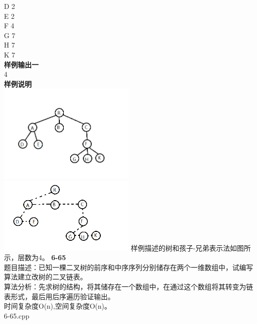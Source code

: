 \documentclass[UTF8,a4paper]{article}
\begin{document}
D 2\\
E 2\\
F 4\\
G 7\\
H 7\\
K 7\\
\textbf{样例输出一}\\
4\\
\textbf{样例说明}\\
\includegraphics[width=0.5\textwidth]{6-62.png}
\includegraphics[width=0.5\textwidth]{6-62-1.png}
样例描述的树和孩子-兄弟表示法如图所示，层数为4。
\newpage
\noindent\textbf{6-65}\\
题目描述：已知一棵二叉树的前序和中序序列分别储存在两个一维数组中，试编写算法建立改树的二叉链表。\\
算法分析：先求树的结构，将其储存在一个数组中，在通过这个数组将其转变为链表形式，最后用后序遍历验证输出。\\
时间复杂度O(n),空间复杂度O(n)。\\
6-65.cpp
\end{document}
